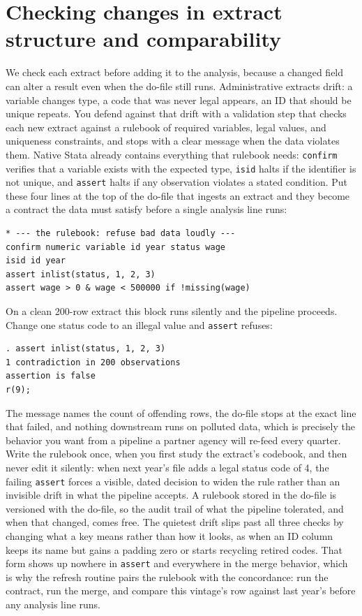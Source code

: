 \documentclass[
    a4paper,
    fontsize=10pt,
    twoside=true,
    numbers=noenddot,
]{kaobook}
\begin{document}
\section{Checking changes in extract structure and comparability}
We check each extract before adding it to the analysis, because a changed field can alter a result even when the do-file still runs. Administrative extracts drift: a variable changes type, a code that was never legal appears, an ID that should be unique repeats. You defend against that drift with a validation step that checks each new extract against a rulebook of required variables, legal values, and uniqueness constraints, and stops with a clear message when the data violates them. Native Stata already contains everything that rulebook needs: \texttt{confirm} verifies that a variable exists with the expected type, \texttt{isid} halts if the identifier is not unique, and \texttt{assert} halts if any observation violates a stated condition. Put these four lines at the top of the do-file that ingests an extract and they become a contract the data must satisfy before a single analysis line runs:
\par
{\footnotesize
\begin{verbatim}
* --- the rulebook: refuse bad data loudly ---
confirm numeric variable id year status wage
isid id year
assert inlist(status, 1, 2, 3)
assert wage > 0 & wage < 500000 if !missing(wage)
\end{verbatim}
}
On a clean 200-row extract this block runs silently and the pipeline proceeds. Change one status code to an illegal value and \texttt{assert} refuses:
\par
{\footnotesize
\begin{verbatim}
. assert inlist(status, 1, 2, 3)
1 contradiction in 200 observations
assertion is false
r(9);
\end{verbatim}
}
The message names the count of offending rows, the do-file stops at the exact line that failed, and nothing downstream runs on polluted data, which is precisely the behavior you want from a pipeline a partner agency will re-feed every quarter. Write the rulebook once, when you first study the extract's codebook, and then never edit it silently: when next year's file adds a legal status code of 4, the failing \texttt{assert} forces a visible, dated decision to widen the rule rather than an invisible drift in what the pipeline accepts. A rulebook stored in the do-file is versioned with the do-file, so the audit trail of what the pipeline tolerated, and when that changed, comes free. The quietest drift slips past all three checks by changing what a key means rather than how it looks, as when an ID column keeps its name but gains a padding zero or starts recycling retired codes. That form shows up nowhere in \texttt{assert} and everywhere in the merge behavior, which is why the refresh routine pairs the rulebook with the concordance: run the contract, run the merge, and compare this vintage's row against last year's before any analysis line runs.
\end{document}
